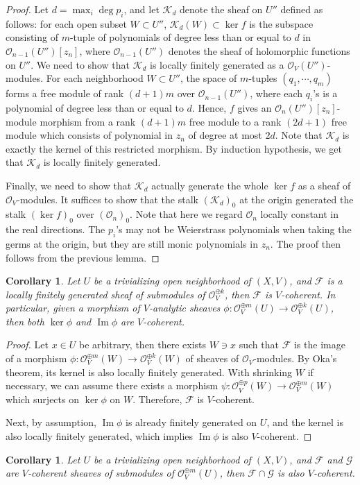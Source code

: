 \documentclass[12pt]{amsart}
\newtheorem{cor}[thm]{Corollary}
\theoremstyle{definition}
\theoremstyle{remark}
\numberwithin{equation}{section}
\newcommand{\CF}{{\mathcal F}}
\newcommand{\CO}{{\mathcal O}}
\newcommand{\1}{{\mathbb{1}}}
\newcommand{\im}{\operatorname{Im}}
\begin{document}
\begin{proof}
Let $d = \max_i \deg p_i $, and let $\mathcal{K}_d$ denote the sheaf on $U''$ defined as follows: for each open subset $W \subset U''$, $\mathcal{K}_d(W) \subset \ker f$ is the subspace consisting of $m$-tuple of polynomials of degree less than or equal to $d$ in $\CO_{n - 1}(U'')[z_n]$, where $\CO_{n - 1}(U'')$ denotes the sheaf of holomorphic functions on $U''$. We need to show that $\mathcal{K}_d$ is locally finitely generated as a $\CO_{V}(U'')$-modules. For each neighborhood $W \subset U''$, the space of $m$-tuples $(q_1,\cdots, q_m)$ forms a free module of rank $(d+1)m$ over $\CO_{n - 1}(U'')$, where each $q_i$'s is a polynomial of degree less than or equal to $d$. Hence, $f$ gives an $\CO_n(U'')[z_n]$-module morphism from a rank $(d + 1)m$ free module to a rank $(2d + 1)$ free module which consists of polynomial in $z_n$ of degree at most $2d$. Note that $\mathcal{K}_d$ is exactly the kernel of this restricted morphism. By induction hypothesis, we get that $\mathcal{K}_d$ is locally finitely generated.

Finally, we need to show that $\mathcal{K}_d$ actually generate the whole $\ker f$ as a sheaf of $\CO_V$-modules. It suffices to show that the stalk $(\mathcal{K}_d)_0$ at the origin generated the stalk $(\ker f)_0$ over $(\CO_n)_0$. Note that here we regard $\CO_n$ locally constant in the real directions. The $p_i$'s may not be Weierstrass polynomials when taking the germs at the origin, but they are still monic polynomials in $z_n$. The proof then follows from the previous lemma.

\end{proof}

\begin{cor}
Let $U$ be a trivializing open neighborhood of $(X,V)$, and $\mathcal{F}$ is a locally finitely generated sheaf of submodules of $\CO_V^{\oplus k}$, then $\mathcal{F}$ is $V$-coherent. In particular, given a morphism of $V$-analytic sheaves $\phi: \CO_V^{\oplus m}(U) \to \CO_V^{\oplus k}(U)$, then both $\ker \phi$ and $\im \phi$ are $V$-coherent.
\end{cor}

\begin{proof}
Let $x\in U$ be arbitrary, then there exists $W\ni x$ such that $\CF$ is the image of a morphism $\phi: \CO_V^{\oplus m}(W) \to \CO_V^{\oplus k}(W)$ of sheaves of $\CO_V$-modules. By Oka's theorem, its kernel is also locally finitely generated. With shrinking $W$ if necessary, we can assume there exists a morphism $\psi: \CO_V^{\oplus p}(W) \to \CO_V^{\oplus m}(W)$ which surjects on $\ker \phi$ on $W$. Therefore, $\CF$ is $V$-coherent.

Next, by assumption, $\im \phi$ is already finitely generated on $U$, and the kernel is also locally finitely generated, which implies $\im \phi$ is also $V$-coherent.
\end{proof}
\begin{cor}
Let $U$ be a trivializing open neighborhood of $(X, V)$, and $\mathcal{F}$ and $\mathcal{G}$ are $V$-coherent sheaves of submodules of $\CO^{\oplus m}_V(U)$, then $\mathcal{F}\cap \mathcal{G}$ is also $V$-coherent.
\end{cor}
\end{document}
